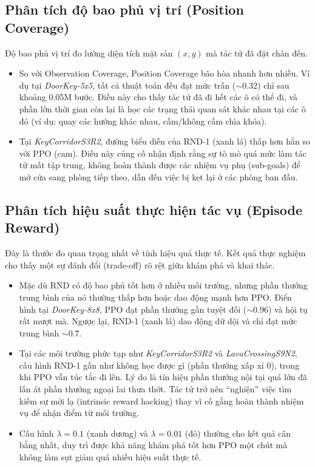 \documentclass{uetgraduation}
\begin{document}
\subsection{Phân tích độ bao phủ vị trí (Position Coverage)}

Độ bao phủ vị trí đo lường diện tích mặt sàn $(x, y)$ mà tác tử đã đặt chân đến.

\begin{itemize}
    \item So với Observation Coverage, Position Coverage bão hòa nhanh hơn nhiều. Ví dụ tại \textit{DoorKey-5x5}, tất cả thuật toán đều đạt mức trần ($\sim 0.32$) chỉ sau khoảng 0.05M bước. Điều này cho thấy tác tử đã đi hết các ô có thể đi, và phần lớn thời gian còn lại là học các trạng thái quan sát khác nhau tại các ô đó (ví dụ: quay các hướng khác nhau, cầm/không cầm chìa khóa).
    
    \item Tại \textit{KeyCorridorS3R2}, đường biểu diễn của RND-1 (xanh lá) thấp hơn hẳn so với PPO (cam). Điều này củng cố nhận định rằng sự tò mò quá mức làm tác tử mất tập trung, không hoàn thành được các nhiệm vụ phụ (sub-goals) để mở cửa sang phòng tiếp theo, dẫn đến việc bị kẹt lại ở các phòng ban đầu.
\end{itemize}

\subsection{Phân tích hiệu suất thực hiện tác vụ (Episode Reward)}

Đây là thước đo quan trọng nhất về tính hiệu quả thực tế. Kết quả thực nghiệm cho thấy một sự đánh đổi (trade-off) rõ rệt giữa khám phá và khai thác.

\begin{itemize}
    \item Mặc dù RND có độ bao phủ tốt hơn ở nhiều môi trường, nhưng phần thưởng trung bình của nó thường thấp hơn hoặc dao động mạnh hơn PPO. Điển hình tại \textit{DoorKey-8x8}, PPO đạt phần thưởng gần tuyệt đối ($\sim 0.96$) và hội tụ rất mượt mà. Ngược lại, RND-1 (xanh lá) dao động dữ dội và chỉ đạt mức trung bình $\sim 0.7$.
    
    \item Tại các môi trường phức tạp như \textit{KeyCorridorS3R2} và \textit{LavaCrossingS9N2}, cấu hình RND-1 gần như không học được gì (phần thưởng xấp xỉ 0), trong khi PPO vẫn túc tắc đi lên. Lý do là tín hiệu phần thưởng nội tại quá lớn đã lấn át phần thưởng ngoại lai thưa thớt. Tác tử trở nên ``nghiện'' việc tìm kiếm sự mới lạ (intrinsic reward hacking) thay vì cố gắng hoàn thành nhiệm vụ để nhận điểm từ môi trường.
    
    \item Cấu hình $\lambda=0.1$ (xanh dương) và $\lambda=0.01$ (đỏ) thường cho kết quả cân bằng nhất, duy trì được khả năng khám phá tốt hơn PPO một chút mà không làm sụt giảm quá nhiều hiệu suất thực tế.
\end{itemize}
\end{document}
